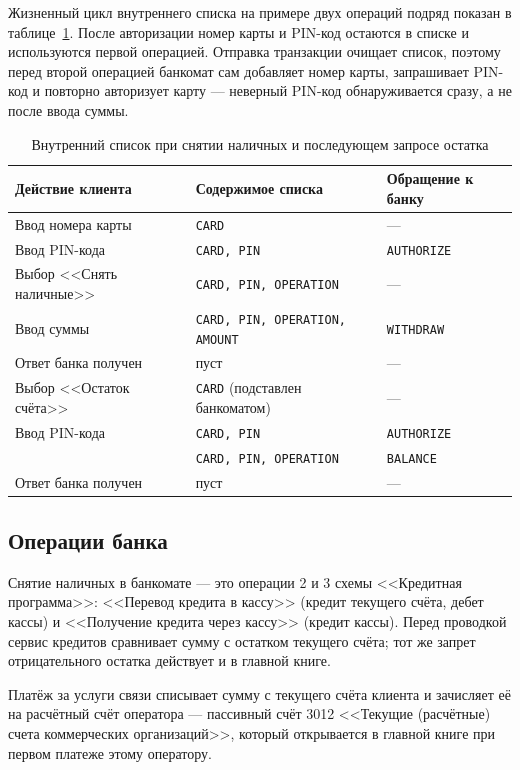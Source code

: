 \documentclass[14pt,a4paper]{extarticle}
\begin{document}
Жизненный цикл внутреннего списка на примере двух операций подряд показан в
таблице~\ref{tab:buffer}. После авторизации номер карты и PIN-код остаются в списке и
используются первой операцией. Отправка транзакции очищает список, поэтому перед второй
операцией банкомат сам добавляет номер карты, запрашивает PIN-код и повторно авторизует
карту --- неверный PIN-код обнаруживается сразу, а не после ввода суммы.

\begin{table}[H]
\caption{Внутренний список при снятии наличных и последующем запросе остатка}
\label{tab:buffer}
\centering
\small
\begin{tabularx}{\textwidth}{lXl}
\toprule
Действие клиента & Содержимое списка & Обращение к банку \\
\midrule
Ввод номера карты & \texttt{CARD} & --- \\
Ввод PIN-кода & \texttt{CARD, PIN} & \texttt{AUTHORIZE} \\
Выбор <<Снять наличные>> & \texttt{CARD, PIN, OPERATION} & --- \\
Ввод суммы & \texttt{CARD, PIN, OPERATION, AMOUNT} & \texttt{WITHDRAW} \\
Ответ банка получен & пуст & --- \\
Выбор <<Остаток счёта>> & \texttt{CARD} (подставлен банкоматом) & --- \\
Ввод PIN-кода & \texttt{CARD, PIN} & \texttt{AUTHORIZE} \\
 & \texttt{CARD, PIN, OPERATION} & \texttt{BALANCE} \\
Ответ банка получен & пуст & --- \\
\bottomrule
\end{tabularx}
\end{table}

\subsection{Операции банка}

Снятие наличных в банкомате --- это операции 2 и 3 схемы <<Кредитная программа>>:
<<Перевод кредита в кассу>> (кредит текущего счёта, дебет кассы) и <<Получение кредита через
кассу>> (кредит кассы). Перед проводкой сервис кредитов сравнивает сумму с остатком текущего
счёта; тот же запрет отрицательного остатка действует и в главной книге.

Платёж за услуги связи списывает сумму с текущего счёта клиента и зачисляет её на
расчётный счёт оператора --- пассивный счёт 3012 <<Текущие (расчётные) счета коммерческих
организаций>>, который открывается в главной книге при первом платеже этому оператору.
\end{document}
